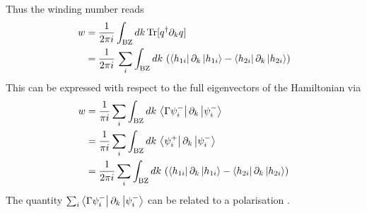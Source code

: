 Thus the winding number reads
\begin{align*}
     w&= \frac{1}{2\pi i} \int_{\text{BZ}} dk\,\text{Tr}[q^\dagger\partial_k q]\\
     &= \frac{1}{2\pi i} \,\sum_i\int_{\text{BZ}} dk\,\left(\bra{h_{1i}} \partial_k\ket{h_{1i}}-\bra{h_{2i}}\partial_k \ket{h_{2i}}\right)
\end{align*}
This can be expressed with respect to the full eigenvectors of the Hamiltonian via
\begin{align*}
    w&= \frac{1}{\pi i}  \sum_i\int_{\text{BZ}} dk\,\bra{\Gamma\psi^-_i}\partial_k\ket{\psi^-_i}\\
    &= \frac{1}{\pi i}  \sum_i\int_{\text{BZ}} dk\,\bra{\psi^+_i}\partial_k\ket{\psi^-_i}\\
    &= \frac{1}{2\pi i}  \sum_i\int_{\text{BZ}} dk\,\left(\bra{h_{1i}} \partial_k\ket{h_{1i}}-\bra{h_{2i}}\partial_k \ket{h_{2i}}\right)
\end{align*}
The quantity $\sum_i\bra{\Gamma\psi^-_i}\partial_k\ket{\psi^-_i}$ can be related to a polarisation \cite{mondragon-shemTopologicalCriticalityChiralSymmetric2014}.


